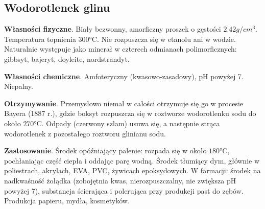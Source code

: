 \subsection{Wodorotlenek glinu }
\textbf{Własności fizyczne}.
Biały bezwonny, amorficzny proszek o gęstości $2.42 \si{g \per cm^3}$.
Temperatura topnienia $300 \si{\celsius}$.
Nie rozpuszcza się w etanolu ani w wodzie.
Naturalnie występuje jako minerał w czterech odmianach polimorficznych: gibbsyt, bajeryt, doyleite, nordstrandyt.

\textbf{Własności chemiczne}.
Amfoteryczny (kwasowo-zasadowy), pH powyżej 7.
Niepalny.

\textbf{Otrzymywanie}.
Przemysłowo niemal w całości otrzymuje się go w procesie Bayera (1887 r.), gdzie boksyt rozpuszcza się w roztworze wodorotlenku sodu do około $270 \si{\celsius}$.
Odpady (czerwony szlam) usuwa się, a następnie strąca wodorotlenek z pozostałego roztworu glinianu sodu.

\textbf{Zastosowanie}.
Środek opóźniający palenie: rozpada się w około $180 \si{\celsius}$, pochłaniając część ciepła i oddając parę wodną.
Środek tłumiący dym, głównie w poliestrach, akrylach, EVA, PVC, żywicach epoksydowych. 
W farmacji: środek na nadkwaśność żołądka (zobojętnia kwas, nierozpuszczalny, nie zwiększa pH powyżej 7), substancja ścierająca i polerująca przy produkcji past do zębów.
Produkcja papieru, mydła, kosmetyków.
